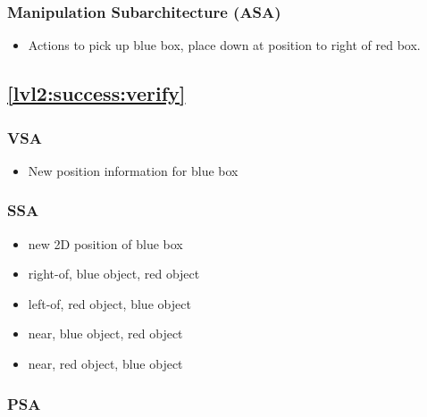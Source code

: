 \documentclass{article}
\begin{document}
\subsubsection{Manipulation Subarchitecture (ASA)}

\begin{itemize}

\item Actions to pick up blue box, place down at position to right of
  red box.

\end{itemize}





\subsection{\ref{lvl2:success:verify}}


\subsubsection{VSA}

\begin{itemize}

\item New position information for blue box

\end{itemize}


\subsubsection{SSA}

\begin{itemize}

\item new 2D position of blue box

\item right-of, blue object, red object

\item left-of, red object, blue object

\item near, blue object, red object

\item near, red object, blue object


\end{itemize}




\subsubsection{PSA}
\end{document}
